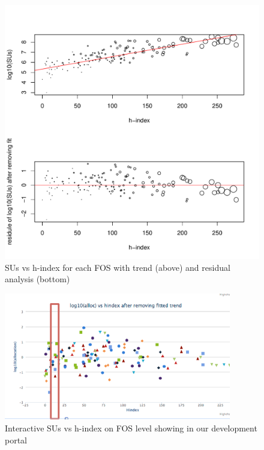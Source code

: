 \documentclass{sig-alternate}
\begin{document}
\begin{figure}[!htb] 
  \centering 
    \includegraphics[width=1.0\columnwidth]{images/05_alloc_vs_hindex_fos_sized_2in1.pdf} 
  \caption{SUs vs h-index for each FOS with trend (above) and residual analysis (bottom)}\label{F:alloc-vs-hindex-fos-sized} 
\end{figure} 
 
 
 
\begin{figure}[!htb] 
  \centering 
    \includegraphics[width=1.0\columnwidth]{images/fig3.pdf} 
  \caption{Interactive SUs vs h-index on FOS level showing in our development portal}\label{F:fig3} 
\end{figure} 
 
\end{document}
